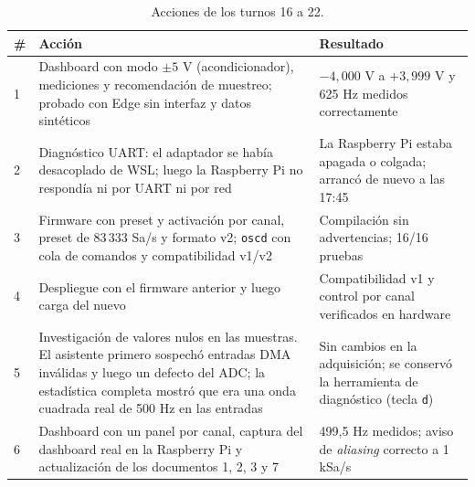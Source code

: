 \documentclass[12pt,a4paper]{article}
\begin{document}
\begin{table}[H]
\centering
\small
\begin{tabular}{@{}p{0.6cm} p{7.2cm} p{7.2cm}@{}}
\toprule
\textbf{\#} & \textbf{Acción} & \textbf{Resultado} \\
\midrule
1 & Dashboard con modo $\pm 5$ V (acondicionador), mediciones y recomendación de muestreo; probado con Edge sin interfaz y datos sintéticos & $-4{,}000$ V a $+3{,}999$ V y 625 Hz medidos correctamente \\
2 & Diagnóstico UART: el adaptador se había desacoplado de WSL; luego la Raspberry Pi no respondía ni por UART ni por red & La Raspberry Pi estaba apagada o colgada; arrancó de nuevo a las 17:45 \\
3 & Firmware con preset y activación por canal, preset de 83\,333 Sa/s y formato v2; \texttt{oscd} con cola de comandos y compatibilidad v1/v2 & Compilación sin advertencias; 16/16 pruebas \\
4 & Despliegue con el firmware anterior y luego carga del nuevo & Compatibilidad v1 y control por canal verificados en hardware \\
5 & Investigación de valores nulos en las muestras. El asistente primero sospechó entradas DMA inválidas y luego un defecto del ADC; la estadística completa mostró que era una onda cuadrada real de 500 Hz en las entradas & Sin cambios en la adquisición; se conservó la herramienta de diagnóstico (tecla \texttt{d}) \\
6 & Dashboard con un panel por canal, captura del dashboard real en la Raspberry Pi y actualización de los documentos 1, 2, 3 y 7 & 499{,}5 Hz medidos; aviso de \emph{aliasing} correcto a 1 kSa/s \\
\bottomrule
\end{tabular}
\caption{Acciones de los turnos 16 a 22.}
\end{table}
\end{document}
